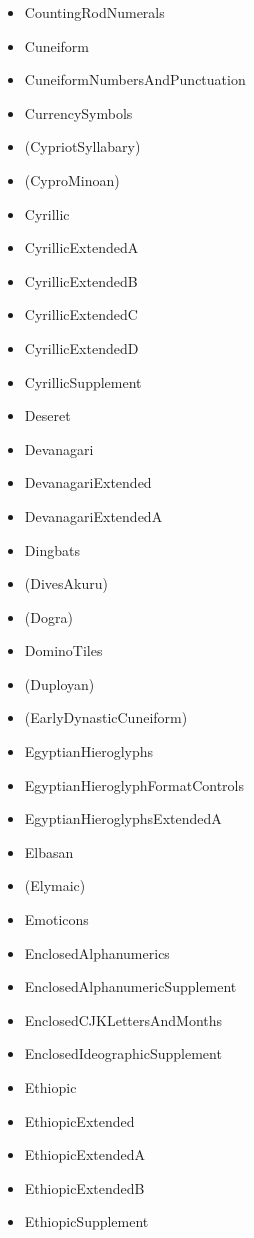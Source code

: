 \documentclass{article}
\newenvironment{itemlist}{%
  \begin{itemize}
  \setlength{\itemsep}{0pt}
  \setlength{\parsep}{0pt}
  \setlength{\topsep}{0pt}
  \setlength{\partopsep}{0pt}
  \setlength{\parskip}{0pt}
  \setlength{\labelsep}{5pt}}%
{
  \end{itemize}}
\begin{document}
\begin{multicols*}{2}
\begin{itemlist}
        \item CountingRodNumerals
        \item Cuneiform
        \item CuneiformNumbersAndPunctuation
        \item CurrencySymbols
        \item (CypriotSyllabary)
        \item (CyproMinoan)
        \item Cyrillic
        \item CyrillicExtendedA
        \item CyrillicExtendedB
        \item CyrillicExtendedC
        \item CyrillicExtendedD
        \item CyrillicSupplement
        \item Deseret
        \item Devanagari
        \item DevanagariExtended
        \item DevanagariExtendedA
        \item Dingbats
        \item (DivesAkuru)
        \item (Dogra)
        \item DominoTiles
        \item (Duployan)
        \item (EarlyDynasticCuneiform)
        \item EgyptianHieroglyphs
        \item EgyptianHieroglyphFormatControls
        \item EgyptianHieroglyphsExtendedA
        \item Elbasan
        \item (Elymaic)
        \item Emoticons
        \item EnclosedAlphanumerics
        \item EnclosedAlphanumericSupplement
        \item EnclosedCJKLettersAndMonths
        \item EnclosedIdeographicSupplement
        \item Ethiopic
        \item EthiopicExtended
        \item EthiopicExtendedA
        \item EthiopicExtendedB
        \item EthiopicSupplement

\end{itemlist}
\end{multicols*}
\end{document}
